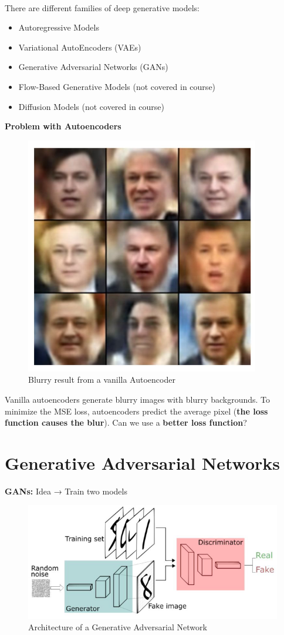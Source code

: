 \\There are different families of deep generative models:
\begin{itemize}
    \item Autoregressive Models
    \item Variational AutoEncoders (VAEs)
    \item Generative Adversarial Networks (GANs)
    \item Flow-Based Generative Models (not covered in course)
    \item Diffusion Models (not covered in course)\\
\end{itemize}

\noindent \textbf{Problem with Autoencoders}\\

\begin{figure}[h!t]
    \centering
    \includegraphics[width=0.4\linewidth]{blurry.png}
    \caption{Blurry result from a vanilla Autoencoder}
    \label{fig:enter-label}
\end{figure}

Vanilla autoencoders generate blurry images with blurry backgrounds. To minimize the MSE loss, autoencoders predict the average pixel (\textbf{the loss function causes the blur}). Can we use a\textbf{ better loss function}?

\section{Generative Adversarial Networks}

\begin{idea}
    \textbf{GANs:} Idea → Train two models
\end{idea}

\begin{figure}[h!t]
    \centering
    \includegraphics[width=0.775\linewidth]{gan.png}
    \caption{Architecture of a Generative Adversarial Network}
    \label{fig:enter-label}
\end{figure}

